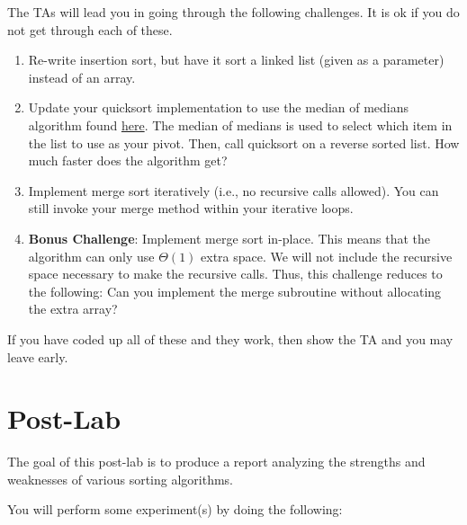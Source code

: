 \documentclass[paper=a4, fontsize=11pt, parskip=full]{scrartcl} %
\numberwithin{equation}{section} %
\numberwithin{figure}{section} %
\numberwithin{table}{section} %
\begin{document}
The TAs will lead you in going through the following challenges. It is ok if you do not get through each of these.

\begin{enumerate}
	\item Re-write insertion sort, but have it sort a linked list (given as a parameter) instead of an array.
	\item Update your quicksort implementation to use the median of medians algorithm found \href{https://brilliant.org/wiki/median-finding-algorithm/}{here}. The median of medians is used to select which item in the list to use as your pivot. Then, call quicksort on a reverse sorted list. How much faster does the algorithm get?
	\item Implement merge sort iteratively (i.e., no recursive calls allowed). You can still invoke your merge method within your iterative loops.
	\item \textbf{Bonus Challenge}: Implement merge sort in-place. This means that the algorithm can only use $\Theta(1)$ extra space. We will not include the recursive space necessary to make the recursive calls. Thus, this challenge reduces to the following: Can you implement the merge subroutine without allocating the extra array?
\end{enumerate}

If you have coded up all of these and they work, then show the TA and you may leave early.




\newpage
\section{Post-Lab}

The goal of this post-lab is to produce a report analyzing the strengths and weaknesses of various sorting algorithms. 

You will perform some experiment(s) by doing the following:
\end{document}
